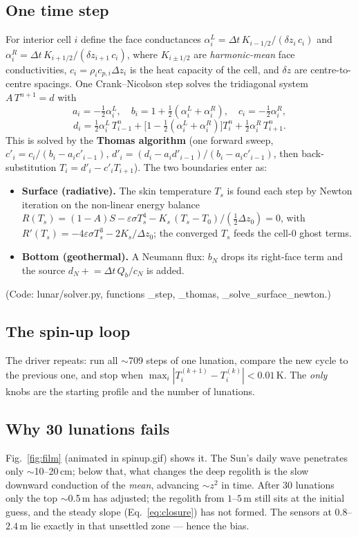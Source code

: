 \documentclass[11pt]{article}
\newcommand{\code}[1]{{\ttfamily\small #1}}
\newcommand{\figref}[1]{Fig.~\ref{#1}}
\begin{document}
\subsection{One time step}
For interior cell $i$ define the face conductances
$\alpha^{L}_i=\Delta t\,K_{i-1/2}/(\delta z_i\,c_i)$ and
$\alpha^{R}_i=\Delta t\,K_{i+1/2}/(\delta z_{i+1}\,c_i)$, where $K_{i\pm1/2}$ are
\emph{harmonic-mean} face conductivities, $c_i=\rho_i c_{p,i}\Delta z_i$ is the
heat capacity of the cell, and $\delta z$ are centre-to-centre spacings. One
Crank--Nicolson step solves the tridiagonal system $A\,T^{n+1}=d$ with
\begin{equation}
a_i=-\tfrac12\alpha^{L}_i,\quad
b_i=1+\tfrac12(\alpha^{L}_i+\alpha^{R}_i),\quad
c_i=-\tfrac12\alpha^{R}_i,
\end{equation}
\begin{equation}
d_i=\tfrac12\alpha^{L}_i\,T^{n}_{i-1}
   +\bigl[1-\tfrac12(\alpha^{L}_i+\alpha^{R}_i)\bigr]T^{n}_i
   +\tfrac12\alpha^{R}_i\,T^{n}_{i+1}.
\end{equation}
This is solved by the \textbf{Thomas algorithm} (one forward sweep,
$c'_i=c_i/(b_i-a_ic'_{i-1})$, $d'_i=(d_i-a_id'_{i-1})/(b_i-a_ic'_{i-1})$, then
back-substitution $T_i=d'_i-c'_iT_{i+1}$). The two boundaries enter as:
\begin{itemize}[leftmargin=1.4em,itemsep=1pt]
\item \textbf{Surface (radiative).} The skin temperature $T_s$ is found each step
by Newton iteration on the non-linear energy balance
$R(T_s)=(1-A)S-\varepsilon\sigma T_s^4-K_s\,(T_s-T_0)/(\tfrac12\Delta z_0)=0$,
with $R'(T_s)=-4\varepsilon\sigma T_s^3-2K_s/\Delta z_0$; the converged $T_s$
feeds the cell-0 ghost terms.
\item \textbf{Bottom (geothermal).} A Neumann flux: $b_{N}$ drops its right-face
term and the source $d_{N}\mathrel{+}=\Delta t\,Q_b/c_N$ is added.
\end{itemize}
(Code: \code{lunar/solver.py}, functions \code{\_step}, \code{\_thomas},
\code{\_solve\_surface\_newton}.)

\subsection{The spin-up loop}
The driver repeats: run all $\sim$709 steps of one lunation, compare the new
cycle to the previous one, and stop when $\max_i|T^{(k+1)}_i-T^{(k)}_i|<0.01$\,K.
The \emph{only} knobs are the starting profile and the number of lunations.

\subsection{Why 30 lunations fails}
\figref{fig:film} (animated in \code{spinup.gif}) shows it. The Sun's daily wave
penetrates only $\sim$10--20\,cm; below that, what changes the deep regolith is
the slow downward conduction of the \emph{mean}, advancing $\sim z^2$ in time.
After 30 lunations only the top $\sim$0.5\,m has adjusted; the regolith from
$1$--$5$\,m still sits at the initial guess, and the steady slope
(Eq.~\eqref{eq:closure}) has not formed. The sensors at $0.8$--$2.4$\,m lie
exactly in that unsettled zone --- hence the bias.
\end{document}
